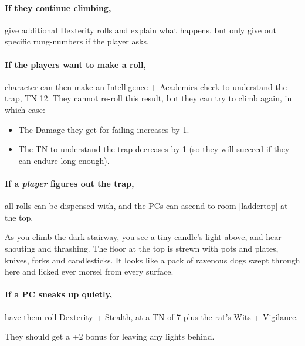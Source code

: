 \begin{multicols}{2}
\paragraph{If they continue climbing,}
give additional Dexterity rolls and explain what happens, but only give out specific rung-numbers if the player asks.

\paragraph{If the players want to make a roll,}
character can then make an Intelligence + Academics check to understand the trap, TN 12.
They cannot re-roll this result, but they can try to climb again, in which case:

\begin{itemize}

  \item
  The Damage they get for failing increases by 1.
  \item
  The TN to understand the trap decreases by 1 (so they will succeed if they can endure long enough).

\end{itemize}

\paragraph{If a \emph{player} figures out the trap,}
all rolls can be dispensed with, and the PCs can ascend to room \ref{laddertop} at the top.


\begin{boxtext}

  As you climb the dark stairway, you see a tiny candle's light above, and hear shouting and thrashing.
  The floor at the top is strewn with pots and plates, knives, forks and candlesticks.
  It looks like a pack of ravenous dogs swept through here and licked ever morsel from every surface.

\end{boxtext}

\paragraph{If a PC sneaks up quietly,}
have them roll Dexterity + Stealth, at a TN of 7 plus the rat's Wits + Vigilance.

They should get a +2 bonus for leaving any lights behind.


\end{multicols}
